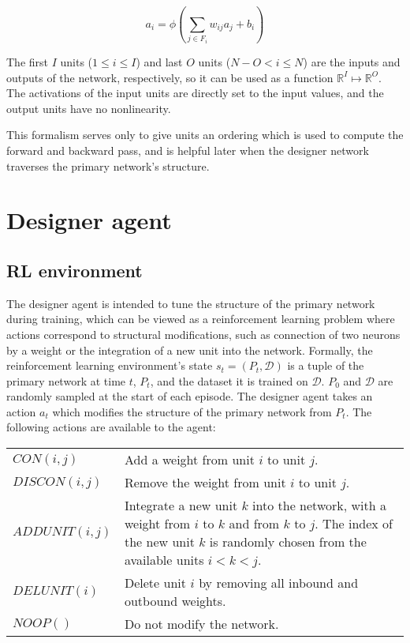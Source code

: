 \documentclass{article}[12px]
\begin{document}
\begin{equation}
a_i = \phi(\sum_{j \in F_i}{w_{ij}a_{j}} + b_i)
\end{equation}

The first \(I\) units (\(1 \le i \le I\)) and last \(O\) units (\(N - O < i \le N\)) are the inputs and outputs of the network, respectively, so it can be used as a function \(\mathbb{R}^I \mapsto \mathbb{R}^O\). The activations of the input units are directly set to the input values, and the output units have no nonlinearity.

This formalism serves only to give units an ordering which is used to compute the forward and backward pass, and is helpful later when the designer network traverses the primary network's structure.

\section{Designer agent} \label{designer}

\subsection{RL environment}

The designer agent is intended to tune the structure of the primary network during training, which can be viewed as a reinforcement learning problem where actions correspond to structural modifications, such as connection of two neurons by a weight or the integration of a new unit into the network. Formally, the reinforcement learning environment's state \(s_t = (P_t, \mathcal{D})\) is a tuple of the primary network at time \(t\), \(P_t\), and the dataset it is trained on \(\mathcal{D}\). \(P_0\) and \(\mathcal{D}\) are randomly sampled at the start of each episode. The designer agent takes an action \(a_t\)  which modifies the structure of the primary network from \(P_t\). The following actions are available to the agent:

\begin{center}
  \begin{tabular}{| l | p{7cm} |}
    \hline
    \(CON(i, j)\) & Add a weight from unit \(i\) to unit \(j\). \\
    \(DISCON(i, j)\) & Remove the weight from unit \(i\) to unit \(j\). \\
    \(ADDUNIT(i, j)\) & Integrate a new unit \(k\) into the network, with a weight from \(i\) to \(k\) and from \(k\) to \(j\). The index of the new  unit \(k\) is randomly chosen from the available units \(i < k < j\). \\
    \(DELUNIT(i)\) & Delete unit \(i\) by removing all inbound and outbound weights. \\
    \(NOOP()\) & Do not modify the network. \\
    \hline
  \end{tabular}
\end{center}
\end{document}
